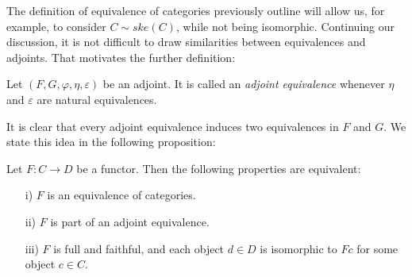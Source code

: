 The definition of equivalence of categories previously outline will allow us, for example, to consider $C\sim ske(C)$, while not being isomorphic. Continuing our discussion, it is not difficult to draw similarities between equivalences and adjoints. That motivates the further definition:
\begin{definition}
  Let $(F,G,\varphi,\eta,\varepsilon)$ be an adjoint. It is called an \emph{adjoint equivalence} whenever $\eta$ and $\varepsilon$ are natural equivalences.
\end{definition}
It is clear that every adjoint equivalence induces two equivalences in $F$ and $G$. We state this idea in the following proposition:
\begin{proposition}\cite[Theorem 1, 4.4]{mac2013categories}
  Let $F:C\to D$ be a functor. Then the following properties are equivalent:
  \begin{itemize}
  \item[i)] $F$ is an equivalence of categories.
  \item[ii)] $F$ is part of an adjoint equivalence. 
  \item[iii)] $F$ is full and faithful, and each object $d\in D$ is isomorphic to $Fc$ for some object $c\in C$.  
  \end{itemize}  
\end{proposition}
